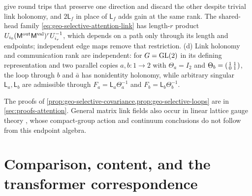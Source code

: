 give round trips that preserve one direction and discard the other despite
trivial link holonomy, and \(2\mathsf L_f\) in place of \(\mathsf L_f\) adds
gain at the same rank. The shared-head family
\eqref{eq:geo-selective-attention-link} has length-\(r\) product
\(U_{i_0}(\mathsf M^{\rm out}\mathsf M^{\rm val})^rU_{i_r}^{-1}\), which depends
on a path only through its length and endpoints; independent edge maps remove
that restriction. (d) Link holonomy and communication rank are independent: for
\(G=\mathrm{GL}(2)\) in its defining representation and two parallel copies
\(a,b:1\to2\) with \(\Theta_a=I_2\) and
\(\Theta_b=\begin{psmallmatrix}1&1\\0&1\end{psmallmatrix}\), the loop through
\(b\) and \(\bar a\) has nonidentity holonomy, while arbitrary singular
\(\mathsf L_a,\mathsf L_b\) are admissible through
\(F_a=\mathsf L_a\Theta_a^{-1}\) and \(F_b=\mathsf L_b\Theta_b^{-1}\).

The proofs of \cref{prop:geo-selective-covariance,prop:geo-selective-loops} are in \cref{sec:proofs-attention}.
General matrix link fields also occur in linear lattice gauge theory
\citep{Wetterich2014LinearLattice}, whose compact-group action and continuum
conclusions do not follow from this endpoint algebra.

\section{Comparison, content, and the transformer correspondence}
\label{sec:selective-comparison}

